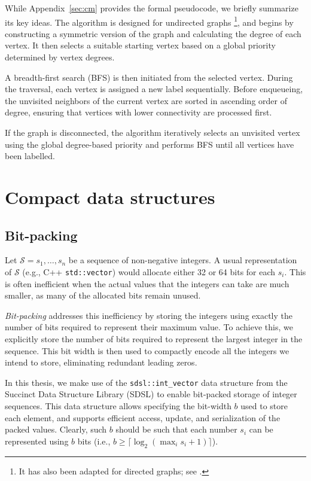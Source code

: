 While Appendix~\ref{sec:cm} provides the formal pseudocode, we briefly summarize its key ideas. The algorithm is designed for undirected graphs \footnote{ It has also been adapted for directed graphs; see \cite{unsymmetricCM}.}, and  begins by constructing a symmetric version of the graph and calculating the degree of each vertex. It then selects a suitable starting vertex based on a global priority determined by vertex degrees.

A breadth-first search (BFS) is then initiated from the selected vertex. During the traversal, each vertex is assigned a new label sequentially. Before enqueueing, the unvisited neighbors of the current vertex are sorted in ascending order of degree, ensuring that vertices with lower connectivity are processed first.

If the graph is disconnected, the algorithm iteratively selects an unvisited vertex using the global degree-based priority and performs BFS until all vertices have been labelled.


\section{Compact data structures}

\subsection{Bit-packing}

Let $\mathcal S = s_1, \dots, s_n$ be a sequence of non-negative integers. A usual representation of $\mathcal S$ (e.g., C++ \verb^std::vector^) would allocate either 32 or 64 bits for each $s_i$. This is often inefficient when the actual values that the integers can take are much smaller, as many of the allocated bits remain unused.

\emph{Bit-packing} addresses this inefficiency by storing the integers using exactly the number of bits required to represent their maximum value. To achieve this, we explicitly store the number of bits required to represent the largest integer in the sequence.  This bit width is then used to compactly encode all the integers we intend to store, eliminating redundant leading zeros.

In this thesis, we make use of the \verb|sdsl::int_vector| data structure from the Succinct Data Structure Library (SDSL) \cite{sdsl}  to enable bit-packed storage of integer sequences. This data structure allows specifying the bit-width \( b \) used to store each element, and supports efficient access, update, and serialization of the packed values. Clearly, such $b$ should be such that each number $s_i$ can be represented using $b$ bits (i.e., $b \ge \lceil \log_2 (\max_i s_i + 1)\rceil $).

